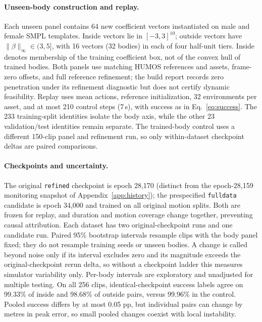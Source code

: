 \paragraph{Unseen-body construction and replay.}
Each unseen panel contains 64 new coefficient vectors instantiated on male and
female SMPL templates. Inside vectors lie in $[-3,3]^{10}$; outside vectors
have $\|\beta\|_\infty\in(3,5]$, with 16 vectors (32 bodies) in each of four
half-unit tiers. Inside denotes membership of the training coefficient box, not
of the convex hull of trained bodies. Both panels use matching HUMOS references
and assets, frame-zero offsets, and full reference refinement; the build report
records zero penetration under its refinement diagnostic but does not certify
dynamic feasibility. Replay uses mean actions, reference initialization, 32
environments per asset, and at most 210 control steps (7\,s), with success as
in Eq.~\eqref{eq:success}. The 233 training-split identities isolate the body
axis, while the other 23 validation/test identities remain separate. The
trained-body control uses a different 150-clip panel and refinement run, so only
within-dataset checkpoint deltas are paired comparisons.

\paragraph{Checkpoints and uncertainty.}
The original \texttt{refined} checkpoint is epoch 28,170 (distinct from the
epoch-28,159 monitoring snapshot of Appendix~\ref{app:history}); the
prespecified \texttt{fulldata} candidate is epoch 34,000 and trained on all
original motion splits. Both are frozen for replay, and duration and motion
coverage change together, preventing causal attribution. Each dataset has two
original-checkpoint runs and one candidate run. Paired 95\% bootstrap intervals
resample clips with the body panel fixed; they do not resample training seeds
or unseen bodies. A change is called beyond noise only if its interval excludes
zero and its magnitude exceeds the original-checkpoint rerun delta, so without
a checkpoint ladder this measures simulator variability only. Per-body
intervals are exploratory and unadjusted for multiple testing. On all 256
clips, identical-checkpoint success labels agree on 99.33\% of inside and
98.68\% of outside pairs, versus 99.96\% in the control. Pooled success differs
by at most 0.05 pp, but individual pairs can change by metres in peak error, so
small pooled changes coexist with local instability.

